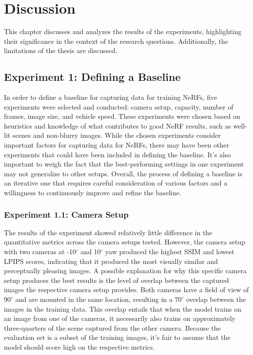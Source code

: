 \chapter{Discussion}
This chapter discusses and analyzes the results of the experiments, highlighting their significance in the context of the research questions. Additionally, the limitations of the thesis are discussed.

\section{Experiment 1: Defining a Baseline}

\begin{comment}
Points to discuss:
- Main point: Discuss the process of choosing which experiments was chosen.
- There might have been other experiments that should've been included in deciding the baseline.
- The way to choose which experiment goes forward could've been done differently.
- Although one experiment seem to do better with the current chosen setup, it might've done worse in another setup.
\end{comment}

In order to define a baseline for capturing data for training NeRFs, five experiments were selected and conducted: camera setup, capacity, number of frames, image size, and vehicle speed. These experiments were chosen based on heuristics and knowledge of what contributes to good NeRF results, such as well-lit scenes and non-blurry images. While the chosen experiments consider important factors for capturing data for NeRFs, there may have been other experiments that could have been included in defining the baseline. It's also important to weigh the fact that the best-performing settings in one experiment may not generalize to other setups. Overall, the process of defining a baseline is an iterative one that requires careful consideration of various factors and a willingness to continuously improve and refine the baseline.

\subsection{Experiment 1.1: Camera Setup}
The results of the experiment showed relatively little difference in the quantitative metrics across the camera setups tested. However, the camera setup with two cameras at -10$^{\circ}$ and 10$^{\circ}$ yaw produced the highest SSIM and lowest LPIPS scores, indicating that it produced the most visually similar and perceptually pleasing images. A possible explanation for why this specific camera setup produces the best results is the level of overlap between the captured images the respective camera setup provides. Both cameras have a field of view of $90^\circ$ and are mounted in the same location, resulting in a $70^\circ$ overlap between the images in the training data. This overlap entails that when the model trains on an image from one of the cameras, it necessarily also trains on approximately three-quarters of the scene captured from the other camera. Because the evaluation set is a subset of the training images, it's fair to assume that the model should score high on the respective metrics.

